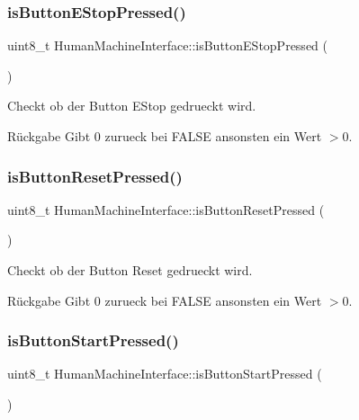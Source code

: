 \subsubsection{\texorpdfstring{is\+Button\+E\+Stop\+Pressed()}{isButtonEStopPressed()}}
{\footnotesize\ttfamily uint8\+\_\+t Human\+Machine\+Interface\+::is\+Button\+E\+Stop\+Pressed (\begin{DoxyParamCaption}{ }\end{DoxyParamCaption})}

Checkt ob der Button E\+Stop gedrueckt wird.

\begin{DoxyReturn}{Rückgabe}
Gibt 0 zurueck bei F\+A\+L\+SE ansonsten ein Wert $>$0. 
\end{DoxyReturn}
\hypertarget{class_human_machine_interface_ab78f8bd8db3e0b150699416d8081ee98}{}\label{class_human_machine_interface_ab78f8bd8db3e0b150699416d8081ee98} 
\subsubsection{\texorpdfstring{is\+Button\+Reset\+Pressed()}{isButtonResetPressed()}}
{\footnotesize\ttfamily uint8\+\_\+t Human\+Machine\+Interface\+::is\+Button\+Reset\+Pressed (\begin{DoxyParamCaption}{ }\end{DoxyParamCaption})}

Checkt ob der Button Reset gedrueckt wird.

\begin{DoxyReturn}{Rückgabe}
Gibt 0 zurueck bei F\+A\+L\+SE ansonsten ein Wert $>$0. 
\end{DoxyReturn}
\hypertarget{class_human_machine_interface_a4926796f1c1411f975e2da96c68079dd}{}\label{class_human_machine_interface_a4926796f1c1411f975e2da96c68079dd} 
\subsubsection{\texorpdfstring{is\+Button\+Start\+Pressed()}{isButtonStartPressed()}}
{\footnotesize\ttfamily uint8\+\_\+t Human\+Machine\+Interface\+::is\+Button\+Start\+Pressed (\begin{DoxyParamCaption}{ }\end{DoxyParamCaption})}


